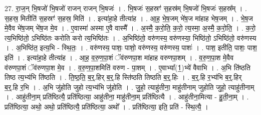 \documentclass[17pt]{extarticle}
\begin{document}
27. रा॒ज॒न् भि॒षजो॑ भि॒षजो॑ राजन् राजन् भि॒षजः॑ । . भि॒षजः॑ स॒हस्रꣳ॑ स॒हस्र॑म् भि॒षजो॑ भि॒षजः॑ स॒हस्र᳚म् । . स॒हस्र॒ मितीति॑ स॒हस्रꣳ॑ स॒हस्र॒ मिति॑ । . इत्या॑हा॒हे तीत्या॑ह । . आ॒ह॒ भे॒ष॒जम् भे॑ष॒ज मा॑हाह भेष॒जम् । . भे॒ष॒ज मे॒वैव भे॑ष॒जम् भे॑ष॒ज मे॒व । . ए॒वास्मा॑ अस्मा ए॒वै वास्मै᳚ । . अ॒स्मै॒ क॒रो॒ति॒ क॒रो॒ त्य॒स्मा॒ अ॒स्मै॒ क॒रो॒ति॒ । . क॒रो॒ त्य॒भिष्ठि॑तो॒ ऽभिष्ठि॑तः करोति करो त्य॒भिष्ठि॑तः । . अ॒भिष्ठि॑तो॒ वरु॑णस्य॒ वरु॑णस्या॒ भिष्ठि॑तो॒ ऽभिष्ठि॑तो॒ वरु॑णस्य । . अ॒भिष्ठि॑त॒ इत्य॒भि - स्थि॒तः॒ । . वरु॑णस्य॒ पाशः॒ पाशो॒ वरु॑णस्य॒ वरु॑णस्य॒ पाशः॑ । . पाश॒ इतीति॒ पाशः॒ पाश॒ इति॑ । . इत्या॑हा॒हे तीत्या॑ह । . आ॒ह॒ व॒रु॒ण॒पा॒शं ॅव॑रुणपा॒श मा॑हाह वरुणपा॒शम् । . व॒रु॒ण॒पा॒श मे॒वैव व॑रुणपा॒शं ॅव॑रुणपा॒श मे॒व । . व॒रु॒ण॒पा॒शमिति॑ वरुण - पा॒शम् । . ए॒वाभ्या᳚(1॒)भ्ये॑ वैवाभि । . अ॒भि ति॑ष्ठति तिष्ठ त्य॒भ्य॑भि ति॑ष्ठति । . ति॒ष्ठ॒ति॒ ब॒र्॒.हिर् ब॒र्॒.हि स्ति॑ष्ठति तिष्ठति ब॒र्॒.हिः । . ब॒र्॒.हि र॒भ्य॑भि ब॒र्॒.हिर् ब॒र्॒.हि र॒भि । . अ॒भि जु॑होति जुहो त्य॒भ्य॑भि जु॑होति । . जु॒हो॒ त्याहु॑तीना॒ माहु॑तीनाम् जुहोति जुहो॒ त्याहु॑तीनाम् । . आहु॑तीना॒म् प्रति॑ष्ठित्यै॒ प्रति॑ष्ठित्या॒ आहु॑तीना॒ माहु॑तीना॒म् प्रति॑ष्ठित्यै । . आहु॑तीना॒मित्या - हु॒ती॒ना॒म् । . प्रति॑ष्ठित्या॒ अथो॒ अथो॒ प्रति॑ष्ठित्यै॒ प्रति॑ष्ठित्या॒ अथो᳚ । . प्रति॑ष्ठित्या॒ इति॒ प्रति॑ - स्थि॒त्यै॒ । \newline
\end{document}
